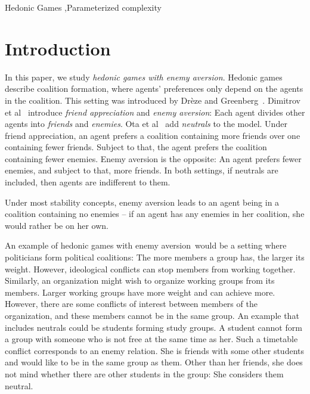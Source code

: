 \documentclass[a4paper,fleqn]{cas-sc}
\newcommand{\agent}{agent\xspace}
\newcommand{\agents}{agents\xspace}
\newcommand{\myemph}[1]{{\color{green!25!black}\emph{#1}}}
\newcommand{\enemyav}{enemy aversion}
\begin{document}
\begin{keywords}
Hedonic Games \sep Parameterized complexity
\end{keywords}


\maketitle 

\section{Introduction}\label{sec:intro}
\label{sec:introduction}



In this paper, we study \myemph{hedonic games with enemy aversion}.
Hedonic games describe coalition formation, where \agents' preferences only depend on the \agents in the coalition. This setting was introduced by Dr{\`e}ze and Greenberg~\cite{DG80hedonic}. 
Dimitrov et al~\cite{dimitrov2006simple} introduce \myemph{friend appreciation} and \myemph{\enemyav}: Each \agent divides other \agents into \myemph{friends} and \myemph{enemies}.
Ota et al~\cite{ohta2017core} add \myemph{neutrals} to the model.
Under friend appreciation, an \agent prefers a coalition containing more friends over one containing fewer friends. Subject to that, the \agent prefers the coalition containing fewer enemies.
Enemy aversion is the opposite: An \agent prefers fewer enemies, and subject to that, more friends. 
In both settings, if neutrals are included, then \agents are indifferent to them.

Under most stability concepts, enemy aversion leads to an \agent being in a coalition containing no enemies -- if an \agent has any enemies in her coalition, she would rather be on her own.

An example of hedonic games with \enemyav\ would be a setting where 
politicians form political coalitions: The more members a group has, the larger its weight. However, ideological conflicts can stop members from working together.
Similarly, an organization might wish to organize working groups from its members.
Larger working groups have more weight and can achieve more.
However, there are some conflicts of interest between members of the organization, and these members cannot be in the same group.
An example that includes neutrals could be students forming study groups.
A student cannot form a group with someone who is not free at the same time as her. 
Such a timetable conflict corresponds to an enemy relation.
She is friends with some other students and would like to be in the same group as them.
Other than her friends, she does not mind whether there are other students in the group: She considers them neutral.
\end{document}
